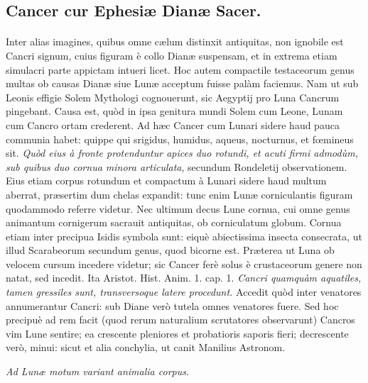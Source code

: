 \documentclass[a4paper, 11pt, oneside, polutonikogreek, latin]{article}
\begin{document}
\subsection{Cancer cur Ephesiæ Dianæ Sacer.}
\paragraph{}
Inter alias imagines, quibus omne cælum distinxit antiquitas, non ignobile est Cancri signum, cuius figuram è collo Dianæ suspensam, et in extrema etiam simulacri parte appictam intueri licet. Hoc autem compactile testaceorum genus multas ob causas Dianæ siue Lunæ acceptum fuisse palàm faciemus. Nam ut sub Leonis effigie Solem Mythologi cognouerunt, sic Aegyptij pro Luna Cancrum pingebant. Causa est, quòd in ipsa genitura mundi Solem cum Leone, Lunam cum Cancro ortam crederent. Ad hæc Cancer cum Lunari sidere haud pauca communia habet: quippe qui srigidus, humidus, aqueus, nocturnus, et fœmineus sit. \emph{Quòd eius à fronte protenduntur apices duo rotundi, et acuti firmi admodùm, sub quibus duo cornua minora articulata}, secundum Rondeletij observationem. Eius etiam corpus rotundum et compactum à Lunari sidere haud multum aberrat, præsertim dum chelas expandit: tunc enim Lunæ corniculantis figuram quodammodo referre videtur. Nec ultimum decus Lune cornua, cui omne genus animantum cornigerum sacrauit antiquitas, ob corniculatum globum. Cornua etiam inter precipua Isidis symbola sunt: eiquè abiectissima insecta consecrata, ut illud Scarabeorum secundum genus, quod bicorne est. Præterea ut Luna ob velocem cursum incedere videtur; sic Cancer ferè solus è crustaceorum genere non natat, sed incedit. Ita Aristot. Hist. Anim. 1. cap. 1. \emph{Cancri quamquàm aquatiles, tamen gressiles sunt, transversoque latere procedunt.} Accedit quòd inter venatores annumerantur Cancri: sub Diane verò tutela omnes venatores fuere. Sed hoc precipuè ad rem facit (quod rerum naturalium scrutatores observarunt) Cancros vim Lune sentire; ea crescente pleniores et probatioris saporis fieri; decrescente verò, minui: sicut et alia conchylia, ut canit Manilius Astronom.

\emph{Ad Lunæ motum variant animalia corpus.}
\end{document}
